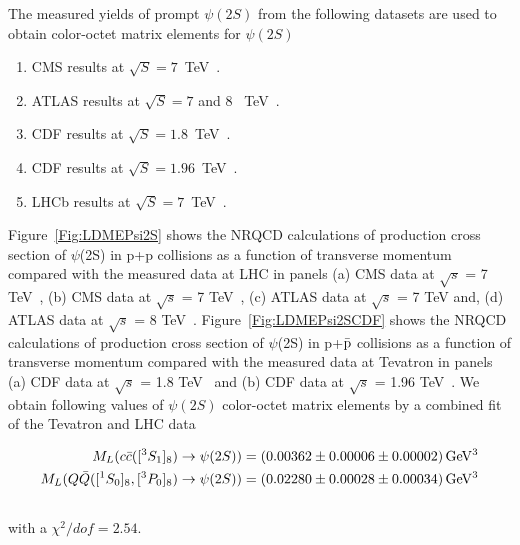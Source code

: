 \documentclass[aps,prc,preprint,superscriptaddress,showpacs,showkeys,amsmath]{revtex4-1}
\begin{document}
The measured yields of prompt $\psi(2S)$ from the following datasets
are used to obtain color-octet matrix elements for $\psi(2S)$ 
\begin{enumerate}
\item{CMS results at $\sqrt{S}=7$~TeV~\cite{Chatrchyan:2011kc,Khachatryan:2015rra}}.
\item{ATLAS results at $\sqrt{S}=7$ and 8 ~TeV~\cite{Aad:2015duc}}.
\item{CDF results at $\sqrt{S}=1.8$~TeV~\cite{Abe:1997jz}}.
\item{CDF results at $\sqrt{S}=1.96$~TeV~\cite{Acosta:2004yw}}.
\item{LHCb results at $\sqrt{S}=7$~TeV~\cite{Aaij:2012ag}}.
\end{enumerate}
Figure~\ref{Fig:LDMEPsi2S} shows the NRQCD calculations of production cross section of 
$\psi$(2S) in p+p collisions as a function of transverse momentum compared with the 
measured data at LHC in panels
(a) CMS data at $\sqrt{s}$ = 7 TeV~\cite{Chatrchyan:2011kc},
(b) CMS data at $\sqrt{s}$ = 7 TeV~\cite{Khachatryan:2015rra}, 
(c) ATLAS data at $\sqrt{s}$ = 7 TeV and, 
(d) ATLAS data at $\sqrt{s}$ = 8 TeV~\cite{Aad:2015duc}. 
 Figure~\ref{Fig:LDMEPsi2SCDF} shows the NRQCD calculations of production cross section 
of $\psi$(2S) in p+{$\bar {\rm p}$} collisions as a function of transverse momentum compared 
with the measured data at Tevatron in panels (a) CDF data at $\sqrt{s}$ = 1.8 TeV~\cite{Abe:1997jz} 
and (b) CDF data at $\sqrt{s}$ = 1.96 TeV~\cite{Acosta:2004yw}. 
We obtain following values of $\psi(2S)$ color-octet matrix elements by a combined fit of 
the Tevatron and LHC data   

\begin{equation}
  \begin{split}
    M_{L}(c{\bar{c}}([^3S_1]_{8})\rightarrow \psi(2S)) &= (0.00362\pm 0.00006 \pm {\color{black} 0.00002}) \, {\rm GeV^3}\\
    M_{L}(Q{\bar{Q}}([^1S_0]_{8},[^3P_0]_{8})\rightarrow \psi(2S)) &= (0.02280\pm 0.00028 \pm {\color{black}0.00034}) \,{\rm GeV^3}\\
     ~\label{eq:COLDME_Psi}
  \end{split}
\end{equation}
with a {\color{black}$\chi^2/dof=2.54$}. 
\end{document}
